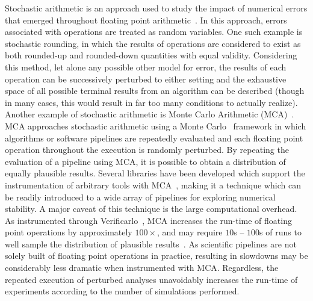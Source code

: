Stochastic arithmetic is an approach used to study the impact of numerical errors that emerged throughout floating
point arithmetic~\cite{vignes1993stochastic,connolly2020stochastic}. In this approach, errors associated with
operations are treated as random variables. One such example is stochastic rounding, in which the results of
operations are considered to exist as both rounded-up and rounded-down quantities with equal validity. Considering
this method, let alone any possible other model for error, the results of each operation can be successively
perturbed to either setting and the exhaustive space of all possible terminal results from an algorithm can be
described (though in many cases, this would result in far too many conditions to actually realize). Another example
of stochastic arithmetic is Monte Carlo Arithmetic (MCA)~\cite{Parker1997-qq}. MCA approaches stochastic
arithmetic using a Monte Carlo~\cite{metropolis1949monte} framework in which algorithms or software pipelines are
repeatedly evaluated and each floating point operation throughout the execution is randomly perturbed. By repeating the
evaluation of a pipeline using MCA, it is possible to obtain a distribution of equally plausible results. Several
libraries have been developed which support the instrumentation of arbitrary tools with
MCA~\cite{frechtling2015mcalib,Denis2016-wo}, making it a technique which can be readily introduced to a wide array of
pipelines for exploring numerical stability. A major caveat of this technique is the large computational overhead. As
instrumented through Verificarlo~\cite{Denis2016-wo}, MCA increases the run-time of floating point operations by
approximately $100 \times$, and may require $10$s – $100$s of runs to well sample the distribution of plausible
results~\cite{Sohier2018-ts}. As scientific pipelines are not solely built of floating point operations in practice,
resulting in slowdowns may be considerably less dramatic when instrumented with MCA. Regardless, the repeated execution
of perturbed analyses unavoidably increases the run-time of experiments according to the number of simulations
performed.

